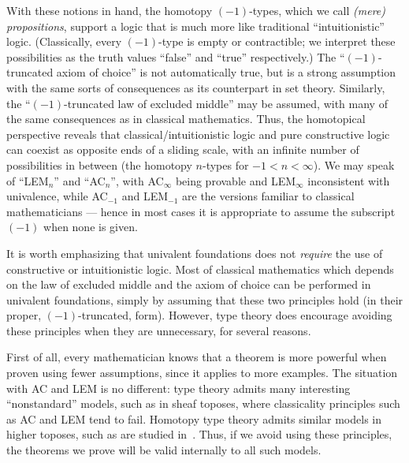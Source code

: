 With these notions in hand, the homotopy $(-1)$-types, which we call \emph{(mere) propositions}, support a logic that is much more like traditional ``intuitionistic'' logic.
(Classically, every $(-1)$-type is empty or contractible; we interpret these possibilities as the truth values ``false'' and ``true'' respectively.)
The ``$(-1)$-truncated axiom of choice'' is not automatically true, but is a strong assumption with the same sorts of consequences as its counterpart in set theory.
Similarly, the ``$(-1)$-truncated law of excluded middle'' may be assumed, with many of the same consequences as in classical mathematics.
Thus, the homotopical perspective reveals that classical/intuitionistic logic and pure constructive logic can coexist as opposite ends of a sliding scale, with an infinite number of possibilities in between (the homotopy $n$-types for $-1 < n < \infty$).
We may speak of ``LEM$_n$'' and ``AC$_n$'', with AC$_\infty$ being provable and LEM$_\infty$ inconsistent with univalence, while AC$_{-1}$ and LEM$_{-1}$ are the versions familiar to classical mathematicians --- hence in most cases it is appropriate to assume the subscript $(-1)$ when none is given.

It is worth emphasizing that univalent foundations does not \emph{require} the use of constructive or intuitionistic logic.
Most of classical mathematics which depends on the law of excluded middle and the axiom of choice can be performed in univalent foundations, simply by assuming that these two principles hold (in their proper, $(-1)$-truncated, form).
However, type theory does encourage avoiding these principles when they are unnecessary, for several reasons.

First of all, every mathematician knows that a theorem is more powerful when proven using fewer assumptions, since it applies to more examples.
The situation with AC and LEM is no different:
type theory admits many interesting ``nonstandard'' models, such as in sheaf toposes, where classicality principles such as AC and LEM tend to fail.
Homotopy type theory admits similar models in higher toposes, such as are studied in~\cite{lurie:higher-topoi}.
Thus, if we avoid using these principles, the theorems we prove will be valid internally to all such models.

